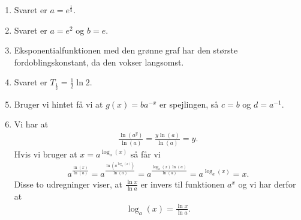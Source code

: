 \begin{enumerate}
	\item Svaret er $a=e^{\frac{1}{5}}$.
	
	
	\item Svaret er $a=e^2$ og $b=e$. 
	
	\item Eksponentialfunktionen med den grønne graf har den største fordoblingskonstant, da den vokser langsomst.
	


	\item Svaret er $T_{\frac{1}{2}}= \frac{1}{2}\ln 2$.
	
	
	\item Bruger vi hintet få vi at $g(x)=ba^{-x}$ er spejlingen, så $c=b$ og $d=a^{-1}$.
	
	
	\item\label{it:eks2ans} Vi har at
	\begin{align*}
	\frac{\ln(a^y)}{\ln(a)}=\frac{y\ln(a)}{\ln(a)}=y.
	\end{align*}
	Hvis vi bruger at $x=a^{\log_a(x)}$ så får vi
	\begin{align*}
	a^{\frac{\ln(x)}{\ln(a)}}=a^{\frac{\ln(a^{\log_a(x)})}{\ln(a)}}=a^{\frac{\log_a(x)\ln(a)}{\ln(a)}}=a^{\log_a(x)}=x.
	\end{align*}
	Disse to udregninger viser, at $\frac{\ln x}{\ln a}$ er invers til funktionen $a^x$ og vi har derfor at
	\begin{align*}
	\log_a(x)=\frac{\ln x}{\ln a}.
	\end{align*}
	
	
\end{enumerate}